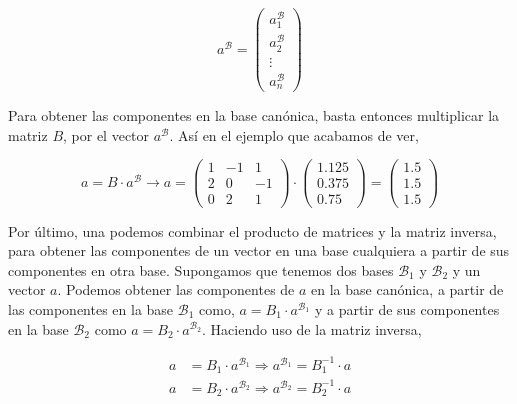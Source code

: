 \begin{equation*}
a^{\mathcal{B}}=\begin{pmatrix}
a_1^{\mathcal{B}}\\
a_2^{\mathcal{B}}\\
\vdots \\
a_n^{\mathcal{B}}
\end{pmatrix}
\end{equation*}

\begin{paracol}{2}
Para obtener las componentes en la base canónica, basta entonces multiplicar la matriz $B$, por el vector $a^{\mathcal{B}}$. Así en el ejemplo que acabamos de ver,
\end{paracol}

\begin{equation*}
a=B\cdot a^{\mathcal{B}} \rightarrow a=\begin{pmatrix}
1& -1& 1\\
2& 0& -1\\
0& 2& 1
\end{pmatrix}\cdot \begin{pmatrix}
1.125\\
0.375\\
0.75
\end{pmatrix}
= \begin{pmatrix}
1.5\\
1.5\\
1.5
\end{pmatrix}
\end{equation*}

\begin{paracol}{2}
Por último, una podemos combinar el producto de matrices y la matriz inversa, para obtener las componentes de un vector en una base cualquiera a partir de sus componentes en otra base. Supongamos que tenemos dos bases $\mathcal{B}_1$ y $\mathcal{B}_2$ y un vector $a$. Podemos obtener las componentes de $a$ en la base canónica, a partir de las componentes en la base $\mathcal{B}_1$ como, $a=B_1\cdot a^{\mathcal{B}_1}$ y a partir de sus componentes en la base $\mathcal{B}_2$ como $a=B_2\cdot a^{\mathcal{B}_2}$. Haciendo uso de la matriz inversa,
\end{paracol}

\begin{align*}
a&=B_1\cdot a^{\mathcal{B}_1} \Rightarrow a^{\mathcal{B}_1}=B_1^{-1} \cdot a \\
 a&=B_2\cdot a^{\mathcal{B}_2} \Rightarrow a^{\mathcal{B}_2}=B_2^{-1} \cdot a
\end{align*}

